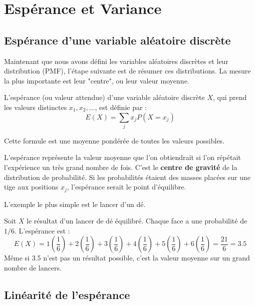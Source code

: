 \newpage
\section{Espérance et Variance }

\subsection{Espérance d'une variable aléatoire discrète}

Maintenant que nous avons défini les variables aléatoires discrètes et leur distribution (PMF), l'étape suivante est de résumer ces distributions. La mesure la plus importante est leur "centre", ou leur valeur moyenne.

\begin{definitionbox}[Espérance]
L'espérance (ou valeur attendue) d'une variable aléatoire discrète $X$, qui prend les valeurs distinctes $x_1, x_2, \dots$, est définie par :
$$ E(X) = \sum_j x_j P(X=x_j) $$
\end{definitionbox}

Cette formule est une moyenne pondérée de toutes les valeurs possibles.

\begin{intuitionbox}
L'espérance représente la valeur moyenne que l'on obtiendrait si l'on répétait l'expérience un très grand nombre de fois. C'est le \textbf{centre de gravité} de la distribution de probabilité. Si les probabilités étaient des masses placées sur une tige aux positions $x_j$, l'espérance serait le point d'équilibre.
\end{intuitionbox}

L'exemple le plus simple est le lancer d'un dé.

\begin{examplebox}[Lancer d'un dé]
Soit $X$ le résultat d'un lancer de dé équilibré. Chaque face a une probabilité de $1/6$. L'espérance est :
$$ E(X) = 1\left(\frac{1}{6}\right) + 2\left(\frac{1}{6}\right) + 3\left(\frac{1}{6}\right) + 4\left(\frac{1}{6}\right) + 5\left(\frac{1}{6}\right) + 6\left(\frac{1}{6}\right) = \frac{21}{6} = 3.5 $$
Même si 3.5 n'est pas un résultat possible, c'est la valeur moyenne sur un grand nombre de lancers.
\end{examplebox}

\subsection{Linéarité de l'espérance}

